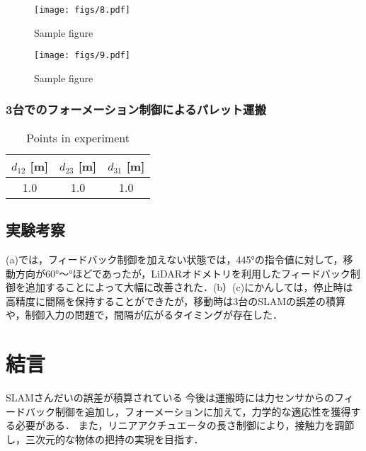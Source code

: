 \documentclass[a4jsme]{jsmepaper}
\begin{document}
\begin{figure}[htbp]
  \begin{center}
  \vspace{1zh}
    \texttt{[image: figs/8.pdf]}
  \end{center}
  \caption{Sample figure}
  \label{fig:fig4}
\end{figure}

\begin{figure}[htbp]
  \begin{center}
  \vspace{1zh}
    \texttt{[image: figs/9.pdf]}
  \end{center}
  \caption{Sample figure}
  \label{fig:fig4}
\end{figure}
\subsubsection{3台でのフォーメーション制御によるパレット運搬}
\begin{table}[htbp]
    \caption{Points in experiment}
    \label{table1}
    \centering
    \begin{tabular}{ccc} \hline
      $d_{12}$ [m] & $d_{23}$ [m] & $d_{31}$ [m] \\ \hline
      1.0 & 1.0 & 1.0 \\ \hline
    \end{tabular}
\end{table}



\subsection{実験考察}
(a)では，フィードバック制御を加えない状態では，445°の指令値に対して，移動方向が60°〜°ほどであったが，LiDARオドメトリを利用したフィードバック制御を追加することによって大幅に改善された．(b）(c)にかんしては，停止時は高精度に間隔を保持することができたが，移動時は3台のSLAMの誤差の積算や，制御入力の問題で，間隔が広がるタイミングが存在した．

\section{結言}
SLAMさんだいの誤差が積算されている
今後は運搬時には力センサからのフィードバック制御を追加し，フォーメーションに加えて，力学的な適応性を獲得する必要がある．
また，リニアアクチュエータの長さ制御により，接触力を調節し，三次元的な物体の把持の実現を目指す．
\end{document}
